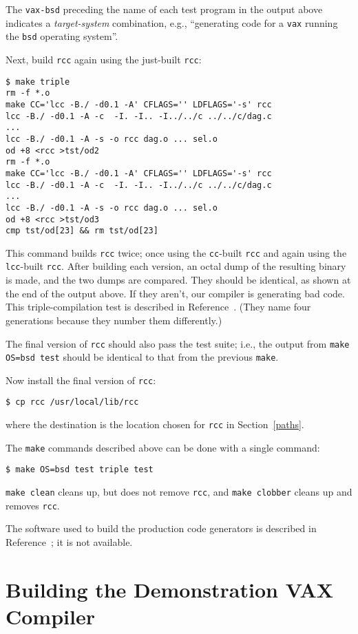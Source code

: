 The \verb|vax-bsd| preceding the name of each test program in the output
above indicates a {\it target\/\it-system\/} combination, e.g.,
``generating code for a \verb|vax| running the
\verb|bsd| operating system''.

Next, build \verb|rcc| again using the just-built \verb|rcc|:
\begin{verbatim}
$ make triple
rm -f *.o
make CC='lcc -B./ -d0.1 -A' CFLAGS='' LDFLAGS='-s' rcc
lcc -B./ -d0.1 -A -c  -I. -I.. -I../../c ../../c/dag.c
...
lcc -B./ -d0.1 -A -s -o rcc dag.o ... sel.o
od +8 <rcc >tst/od2
rm -f *.o
make CC='lcc -B./ -d0.1 -A' CFLAGS='' LDFLAGS='-s' rcc
lcc -B./ -d0.1 -A -c  -I. -I.. -I../../c ../../c/dag.c
...
lcc -B./ -d0.1 -A -s -o rcc dag.o ... sel.o
od +8 <rcc >tst/od3
cmp tst/od[23] && rm tst/od[23]
\end{verbatim}
This command builds \verb|rcc| twice; once using the
\verb|cc|-built \verb|rcc| and again using the \verb|lcc|-built \verb|rcc|.
After building each version, an octal dump of the resulting binary is made,
and the two dumps are compared. They should be identical, as shown
at the end of the output above.
If they aren't, our compiler is generating bad code.
This triple-compilation test is described in Reference~\cite{cornelius:etal:84}.
(They name four generations because they
number them differently.)

The final version of \verb|rcc| should also pass the test suite;
i.e., the output from \verb|make OS=bsd test|
should be identical to that from the previous \verb|make|.

Now install the final version of \verb|rcc|:
\begin{verbatim}
$ cp rcc /usr/local/lib/rcc
\end{verbatim}
where the destination is the location chosen for \verb|rcc| in Section~\ref{paths}.

The \verb|make| commands described above can be done with a single command:
\begin{verbatim}
$ make OS=bsd test triple test
\end{verbatim}
\verb|make clean| cleans up, but does not remove \verb|rcc|, and
\verb|make clobber| cleans up and removes \verb|rcc|.

The software used to build the production code generators
is described in Reference~\cite{fraser:sigplan89}; it is not available.

\section{Building the Demonstration VAX Compiler}\label{gen3}

